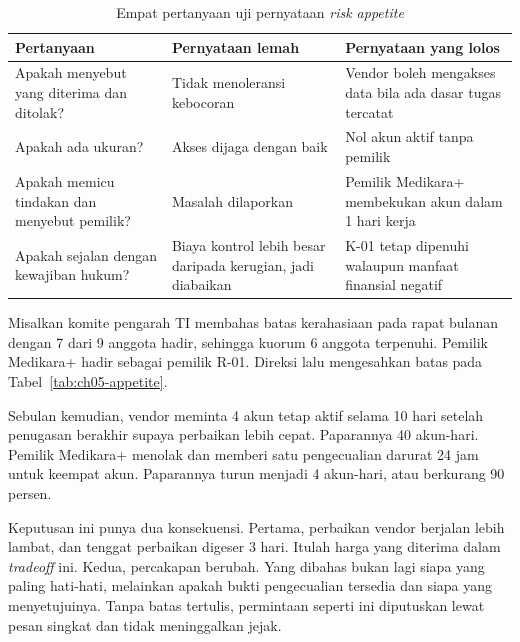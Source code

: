 \begin{table}[!htb]
  \centering\small
  \caption{Empat pertanyaan uji pernyataan \textit{risk appetite}}\label{tab:ch05-uji}
  \begin{tabularx}{\textwidth}{|>{\raggedright\arraybackslash}p{}|>{\raggedright\arraybackslash}X|>{\raggedright\arraybackslash}X|}
    \hline
    \textbf{Pertanyaan} & \textbf{Pernyataan lemah} & \textbf{Pernyataan yang lolos} \\ \hline
    Apakah menyebut yang diterima dan ditolak? & Tidak menoleransi kebocoran & Vendor boleh mengakses
    data bila ada dasar tugas tercatat \\ \hline
    Apakah ada ukuran? & Akses dijaga dengan baik & Nol akun aktif tanpa pemilik \\ \hline
    Apakah memicu tindakan dan menyebut pemilik? & Masalah dilaporkan & Pemilik Medikara+ membekukan
    akun dalam 1 hari kerja \\ \hline
    Apakah sejalan dengan kewajiban hukum? & Biaya kontrol lebih besar daripada kerugian, jadi
    diabaikan & K-01 tetap dipenuhi walaupun manfaat finansial negatif \\ \hline
  \end{tabularx}
\end{table}

\begin{kasus}[title={Kasus Medikara Health: Batas Risiko yang Disahkan Direksi}]
Misalkan komite pengarah TI membahas batas kerahasiaan pada rapat bulanan dengan 7 dari 9 anggota
hadir, sehingga kuorum 6 anggota terpenuhi. Pemilik Medikara+ hadir sebagai pemilik R-01. Direksi lalu
mengesahkan batas pada Tabel~\ref{tab:ch05-appetite}.

Sebulan kemudian, vendor meminta 4 akun tetap aktif selama 10 hari setelah penugasan berakhir supaya
perbaikan lebih cepat. Paparannya 40 akun-hari. Pemilik Medikara+ menolak dan memberi satu pengecualian
darurat 24 jam untuk keempat akun. Paparannya turun menjadi 4 akun-hari, atau berkurang 90 persen.

Keputusan ini punya dua konsekuensi. Pertama, perbaikan vendor berjalan lebih lambat, dan tenggat
perbaikan digeser 3 hari. Itulah harga yang diterima dalam \textit{tradeoff} ini. Kedua, percakapan
berubah. Yang dibahas bukan lagi siapa yang paling hati-hati, melainkan apakah bukti pengecualian
tersedia dan siapa yang menyetujuinya. Tanpa batas tertulis, permintaan seperti ini diputuskan lewat
pesan singkat dan tidak meninggalkan jejak.
\end{kasus}

